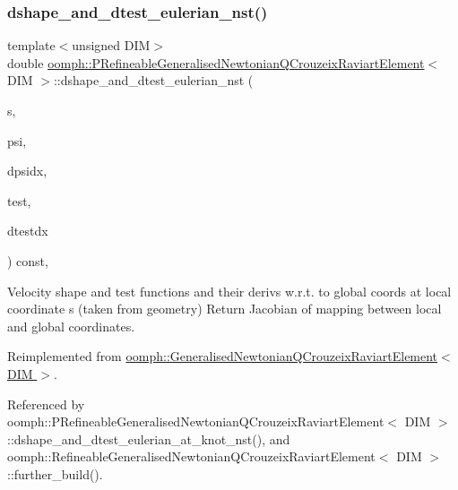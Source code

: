 \subsubsection{\texorpdfstring{dshape\+\_\+and\+\_\+dtest\+\_\+eulerian\+\_\+nst()}{dshape\_and\_dtest\_eulerian\_nst()}\hspace{0.1cm}{\footnotesize\ttfamily [1/3]}}
{\footnotesize\ttfamily template$<$unsigned D\+IM$>$ \\
double \hyperlink{classoomph_1_1PRefineableGeneralisedNewtonianQCrouzeixRaviartElement}{oomph\+::\+P\+Refineable\+Generalised\+Newtonian\+Q\+Crouzeix\+Raviart\+Element}$<$ D\+IM $>$\+::dshape\+\_\+and\+\_\+dtest\+\_\+eulerian\+\_\+nst (\begin{DoxyParamCaption}\item[{const \hyperlink{classoomph_1_1Vector}{Vector}$<$ double $>$ \&}]{s,  }\item[{\hyperlink{classoomph_1_1Shape}{Shape} \&}]{psi,  }\item[{\hyperlink{classoomph_1_1DShape}{D\+Shape} \&}]{dpsidx,  }\item[{\hyperlink{classoomph_1_1Shape}{Shape} \&}]{test,  }\item[{\hyperlink{classoomph_1_1DShape}{D\+Shape} \&}]{dtestdx }\end{DoxyParamCaption}) const\hspace{0.3cm}{\ttfamily [inline]}, {\ttfamily [virtual]}}



Velocity shape and test functions and their derivs w.\+r.\+t. to global coords at local coordinate s (taken from geometry) Return Jacobian of mapping between local and global coordinates. 



Reimplemented from \hyperlink{classoomph_1_1GeneralisedNewtonianQCrouzeixRaviartElement_a815dca7d5b556835865c7691e547bc37}{oomph\+::\+Generalised\+Newtonian\+Q\+Crouzeix\+Raviart\+Element$<$ D\+I\+M $>$}.



Referenced by oomph\+::\+P\+Refineable\+Generalised\+Newtonian\+Q\+Crouzeix\+Raviart\+Element$<$ D\+I\+M $>$\+::dshape\+\_\+and\+\_\+dtest\+\_\+eulerian\+\_\+at\+\_\+knot\+\_\+nst(), and oomph\+::\+Refineable\+Generalised\+Newtonian\+Q\+Crouzeix\+Raviart\+Element$<$ D\+I\+M $>$\+::further\+\_\+build().

\mbox{\label{classoomph_1_1PRefineableGeneralisedNewtonianQCrouzeixRaviartElement_a2524fa4ced356156df1882df4b3d1b91}} 
